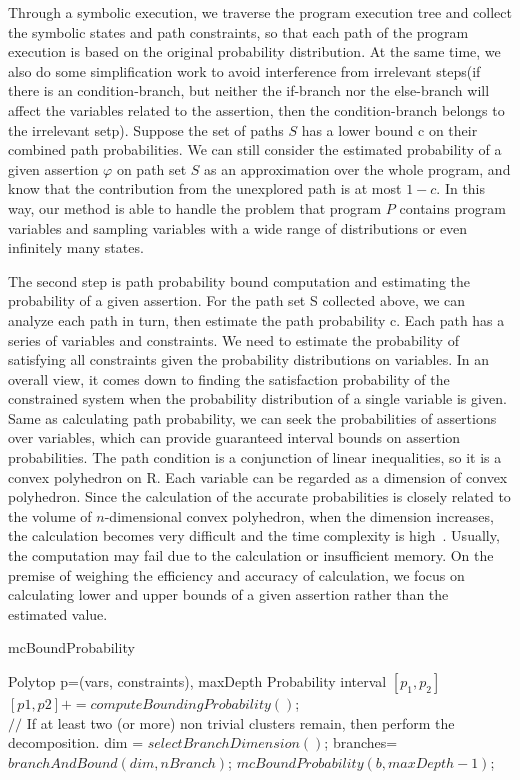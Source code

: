 \documentclass[runningheads]{llncs}
\begin{document}
Through a symbolic execution, we traverse the program execution tree and collect the symbolic states and path constraints, so that each path of the program execution is based on the original probability distribution. At the same time, we also do some simplification work to avoid interference from irrelevant steps(if there is an condition-branch, but neither the if-branch nor the else-branch will affect the variables related to the assertion, then the condition-branch belongs to the irrelevant setp).
Suppose the set of paths $S$ has a lower bound c on their combined path probabilities. We can still consider the estimated probability of a given assertion $\varphi$ on path set $S$ as an approximation over the whole program, and know that the contribution from the unexplored path is at most $1-c$. In this way, our method is able to handle the problem that program $P$ contains program variables and sampling variables with a wide range of distributions or even infinitely many states. 

The second step is path probability bound computation and estimating the probability of a given assertion. 
For the path set S collected above, we can analyze each path in turn, then estimate the path probability c. Each path has a series of variables and constraints. We need to estimate the probability of satisfying all constraints given the probability distributions on variables. In an overall view, it comes down to finding the satisfaction probability of the constrained system when the probability distribution of a single variable is given. Same as calculating path probability, we can seek the probabilities of assertions over variables, which can provide guaranteed interval bounds on assertion probabilities. The path condition is a conjunction of linear inequalities, so it is a convex polyhedron on R. Each variable can be regarded as a dimension of convex polyhedron.
Since the calculation of the accurate probabilities is closely related to the volume of $n$-dimensional convex polyhedron, when the dimension increases, the calculation becomes very difficult and the time complexity is high~\cite{Arora1998Proof}. Usually, the computation may fail due to the calculation or insufficient memory. 
On the premise of weighing the efficiency and accuracy of calculation, we focus on calculating lower and upper bounds of a given assertion rather than the estimated value. 

\begin{algorithm}	
	\caption{mcBoundProbability}	
	\label{mcBoundProbability}	
	\begin{algorithmic}[1]	
		\REQUIRE Polytop p=(vars, constraints), maxDepth		
		\ENSURE Probability interval $[p_1, p_2]$		
		\STATE $[p1,p2]+=computeBoundingProbability()$;	
		\ENDIF  \\		
		$//$ If at least two (or more) non trivial clusters remain, then perform the decomposition.  		
		\STATE dim = $selectBranchDimension()$;		
		\STATE branches= $branchAndBound(dim, nBranch)$;		
		\STATE $mcBoundProbability(b, maxDepth-1)$;		
		\ENDFOR
		\ENDIF
	\end{algorithmic}
\end{algorithm}
\end{document}
